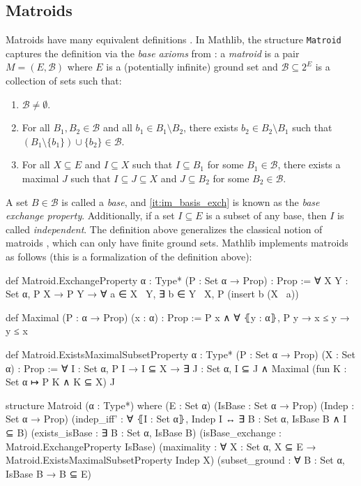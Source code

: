\subsection{Matroids}

Matroids have many equivalent definitions \cite{Oxley2011,Truemper2016,Bruhn2013}. In Mathlib, the structure \texttt{Matroid} captures the definition via the \emph{base axioms} from \cite{Bruhn2013}: a \emph{matroid} is a pair $M = (E, \mathcal{B})$ where $E$ is a (potentially infinite) ground set and $\mathcal{B} \subseteq 2^{E}$ is a collection of sets such that:
\begin{enumerate}[label=(\roman*)]
    \item $\mathcal{B} \neq \emptyset$.
    \item\label{it:im_basis_exch} For all $B_{1}, B_{2} \in \mathcal{B}$ and all $b_{1} \in B_{1} \setminus B_{2}$, there exists $b_{2} \in B_{2} \setminus B_{1}$ such that $(B_{1} \setminus \{b_{1}\}) \cup \{b_{2}\} \in \mathcal{B}$.
    \item For all $X \subseteq E$ and $I \subseteq X$ such that $I \subseteq B_{1}$ for some $B_{1} \in \mathcal{B}$, there exists a maximal $J$ such that $I \subseteq J \subseteq X$ and $J \subseteq B_{2}$ for some $B_{2} \in \mathcal{B}$.
\end{enumerate}
A set $B \in \mathcal{B}$ is called a \emph{base}, and \ref{it:im_basis_exch} is known as the \emph{base exchange property}. Additionally, if a set $I \subseteq E$ is a subset of any base, then $I$ is called \emph{independent}. The definition above generalizes the classical notion of matroids \cite{Oxley2011,Truemper2016}, which can only have finite ground sets. Mathlib implements matroids as follows (this is a formalization of the definition above):
\begin{leancode}
def Matroid.ExchangeProperty {α : Type*} 
    (P : Set α → Prop) : Prop :=
  ∀ X Y : Set α, P X → P Y → ∀ a ∈ X \ Y,
    ∃ b ∈ Y \ X, P (insert b (X \ {a}))
\end{leancode}
\begin{leancode}
def Maximal (P : α → Prop) (x : α) : Prop :=
  P x ∧ ∀ ⦃y : α⦄, P y → x ≤ y → y ≤ x
\end{leancode}
\begin{leancode}
def Matroid.ExistsMaximalSubsetProperty 
    {α : Type*} (P : Set α → Prop) 
    (X : Set α) : Prop :=
  ∀ I : Set α, P I → I ⊆ X →
    ∃ J : Set α, I ⊆ J ∧ Maximal
        (fun K : Set α ↦ P K ∧ K ⊆ X) J
\end{leancode}
\begin{leancode}
structure Matroid (α : Type*) where
  (E : Set α)
  (IsBase : Set α → Prop)
  (Indep : Set α → Prop)
  (indep_iff' : ∀ ⦃I : Set α⦄, Indep I ↔
        ∃ B : Set α, IsBase B ∧ I ⊆ B)
  (exists_isBase : ∃ B : Set α, IsBase B)
  (isBase_exchange : 
    Matroid.ExchangeProperty IsBase)
  (maximality : ∀ X : Set α, X ⊆ E →
    Matroid.ExistsMaximalSubsetProperty Indep X)
  (subset_ground : ∀ B : Set α, IsBase B → B ⊆ E)
\end{leancode}
